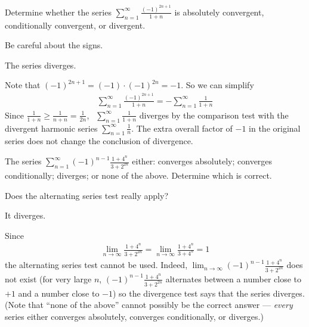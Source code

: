 \begin{Mquestion}[2016Q6]
Determine whether the series
$\displaystyle\sum_{n=1}^\infty\frac{(-1)^{2n+1}}{1+n}$
is absolutely convergent, conditionally convergent, or divergent.
\end{Mquestion}

\begin{hint}
Be careful about the signs.
\end{hint}

\begin{answer}
The series diverges.
\end{answer}

\begin{solution}
Note that $(-1)^{2n+1}=(-1)\cdot(-1)^{2n}=-1$. So we can simplify
\begin{align*}
  \sum_{n=1}^\infty\frac{(-1)^{2n+1}}{1+n}=-\sum_{n=1}^\infty\frac{1}{1+n}
\end{align*}
Since $\displaystyle \frac{1}{1+n} \geq \frac{1}{n+n} = \frac{1}{2n}$,
$\ \ \displaystyle \sum_{n=1}^\infty\frac{1}{1+n}$
diverges by the comparison test with the divergent harmonic series $\sum\limits_{n=1}^\infty\frac{1}{n}$. The extra overall factor of $-1$ in the original series
does not change the conclusion of divergence.

\end{solution}

\begin{question}[2016Q6]
The series
$\displaystyle \sum_{n=1}^{\infty} (-1)^{n-1} \frac{1+4^n}{3+2^{2n}}$ either:
              converges absolutely;
             converges conditionally;
            diverges; or
            none of the above.
Determine which  is correct.

\end{question}

\begin{hint}
Does the alternating series test really apply?
\end{hint}

\begin{answer}
It diverges.
\end{answer}

\begin{solution}
Since
\begin{align*}
 \lim_{n\to\infty} \frac{1+4^n}{3+2^{2n}}
=\lim_{n\to\infty} \frac{1+4^n}{3+4^n}
= 1
\end{align*}
the alternating series test cannot be used. Indeed,
$\displaystyle \lim_{n\to\infty} (-1)^{n-1} \frac{1+4^n}{3+2^{2n}}$ does not exist
(for very large $n$,   $ (-1)^{n-1} \frac{1+4^n}{3+2^{2n}}$ alternates between a number
close to $+1$ and a number close to $-1$)
so the divergence test says that the series diverges.
(Note that ``none of the above'' cannot possibly be the correct answer ---
\emph{every} series either converges absolutely, converges conditionally, or diverges.)
\end{solution}



